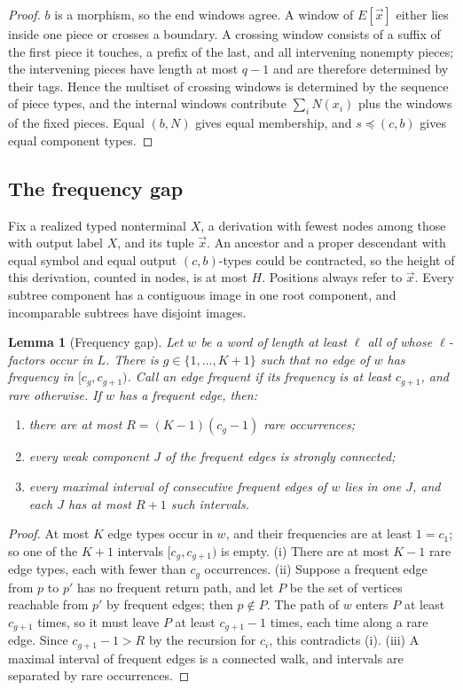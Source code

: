 \documentclass[11pt]{article}
\numberwithin{equation}{section}
\theoremstyle{plain}
\newtheorem{lemma}[theorem]{Lemma}
\theoremstyle{definition}
\theoremstyle{remark}
\theoremstyle{plain}
\newcommand{\tuple}[1]{\vec{#1}}
\begin{document}
\begin{proof}
$b$ is a morphism, so the end windows agree.  A window of $E[\tuple x]$ either
lies inside one piece or crosses a boundary.  A crossing window consists of a
suffix of the first piece it touches, a prefix of the last, and all intervening
nonempty pieces; the intervening pieces have length at most $q-1$ and are
therefore determined by their tags.  Hence the multiset of crossing windows is
determined by the sequence of piece types, and the internal windows contribute
$\sum_iN(x_i)$ plus the windows of the fixed pieces.  Equal $(b,N)$ gives equal
membership, and $s\preceq(c,b)$ gives equal component types.
\end{proof}

\subsection{The frequency gap}

Fix a realized typed nonterminal $X$, a derivation with fewest nodes among those
with output label $X$, and its tuple $\tuple x$.  An ancestor and a proper
descendant with equal symbol and equal output $(c,b)$-types could be contracted,
so the height of this derivation, counted in nodes, is at most $H$.  Positions
always refer to $\tuple x$.  Every subtree component has a contiguous image in
one root component, and incomparable subtrees have disjoint images.

\begin{lemma}[Frequency gap]
\label{lem:gap}
Let $w$ be a word of length at least $\ell$ all of whose $\ell$-factors occur in
$L$.  There is $g\in\{1,\ldots,K+1\}$ such that no edge of $w$ has frequency in
$[c_g,c_{g+1})$.  Call an edge \emph{frequent} if its frequency is at least
$c_{g+1}$, and \emph{rare} otherwise.  If $w$ has a frequent edge, then:
\begin{enumerate}[label=(\roman*),leftmargin=*]
\item there are at most $R=(K-1)(c_g-1)$ rare occurrences;
\item every weak component $J$ of the frequent edges is strongly connected;
\item every maximal interval of consecutive frequent edges of $w$ lies in one $J$,
and each $J$ has at most $R+1$ such intervals.
\end{enumerate}
\end{lemma}

\begin{proof}
At most $K$ edge types occur in $w$, and their frequencies are at least
$1=c_1$; so one of the $K+1$ intervals $[c_g,c_{g+1})$ is empty.  (i) There are
at most $K-1$ rare edge types, each with fewer than $c_g$ occurrences.
(ii) Suppose a frequent edge from $p$ to $p'$ has no frequent return path, and
let $P$ be the set of vertices reachable from $p'$ by frequent edges; then
$p\notin P$.  The path of $w$ enters $P$ at least $c_{g+1}$ times, so it must
leave $P$ at least $c_{g+1}-1$ times, each time along a rare edge.  Since
$c_{g+1}-1>R$ by the recursion for $c_i$, this contradicts (i).  (iii) A maximal
interval of frequent edges is a connected walk, and intervals are separated by
rare occurrences.
\end{proof}
\end{document}
